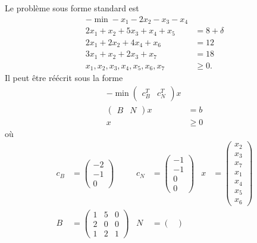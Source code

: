 \begin{enumerate}
    \begin{solution}
      Le problème sous forme standard est
      \begin{align*}
        -\min -x_1 - 2x_2 - x_3 - x_4\\
        2x_1+x_2+5x_3+x_4 + x_5 & = 8 + \delta\\
        2x_1+ 2x_2+ 4x_4 + x_6 & = 12\\
        3x_1+ x_2+ 2x_3 + x_7 & = 18\\
        x_1, x_2, x_3, x_4, x_5, x_6, x_7 & \geq 0.
      \end{align*}
      Il peut être réécrit sous la forme
      \begin{align*}
        -\min
        \begin{pmatrix}
          c_B^T & c_N^T
        \end{pmatrix}
        x\\
        \begin{pmatrix}
          B & N
        \end{pmatrix}
        x & = b\\
        x & \geq 0
      \end{align*}
      où
      \begin{align*}
        c_B & =
        \begin{pmatrix}
          -2\\-1\\0
        \end{pmatrix}
        & c_N & =
        \begin{pmatrix}
          -1\\-1\\0\\0
        \end{pmatrix}
        & x & =
        \begin{pmatrix}
          x_2\\x_3\\x_7\\x_1\\x_4\\x_5\\x_6
        \end{pmatrix}\\
        B & =
        \begin{pmatrix}
          1 & 5 & 0\\
          2 & 0 & 0\\
          1 & 2 & 1
        \end{pmatrix}
        & N & =
        \begin{pmatrix}

\end{pmatrix}
\end{align*}
\end{solution}
\end{enumerate}
